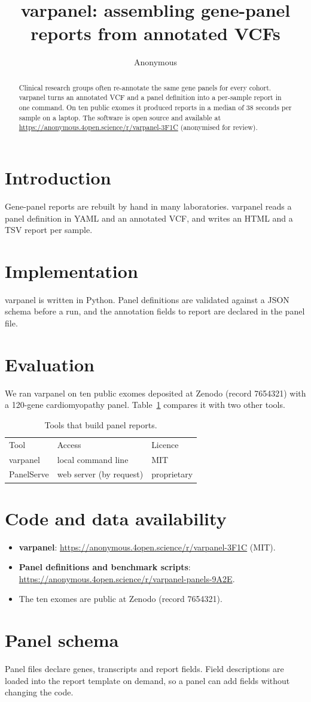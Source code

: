 \documentclass{article}
\title{varpanel: assembling gene-panel reports from annotated VCFs}
\author{Anonymous}
\begin{document}
\maketitle

\begin{abstract}
Clinical research groups often re-annotate the same gene panels for every cohort. varpanel turns an
annotated VCF and a panel definition into a per-sample report in one command. On ten public exomes it
produced reports in a median of 38 seconds per sample on a laptop. The software is open source and
available at \url{https://anonymous.4open.science/r/varpanel-3F1C} (anonymised for review).
\end{abstract}

\section{Introduction}
Gene-panel reports are rebuilt by hand in many laboratories. varpanel reads a panel definition in YAML
and an annotated VCF, and writes an HTML and a TSV report per sample.

\section{Implementation}
varpanel is written in Python. Panel definitions are validated against a JSON schema before a run, and
the annotation fields to report are declared in the panel file.

\section{Evaluation}
We ran varpanel on ten public exomes deposited at Zenodo (record 7654321) with a 120-gene cardiomyopathy
panel. Table~\ref{tab:tools} compares it with two other tools.

\begin{table}[h]
\caption{Tools that build panel reports.}
\label{tab:tools}
\begin{tabular}{lll}
Tool & Access & Licence \\
varpanel & local command line & MIT \\
PanelServe & web server (by request) & proprietary \\
\end{tabular}
\end{table}

\section{Code and data availability}
\begin{itemize}
    \item \textbf{varpanel}: \url{https://anonymous.4open.science/r/varpanel-3F1C} (MIT).
    \item \textbf{Panel definitions and benchmark scripts}:
    \url{https://anonymous.4open.science/r/varpanel-panels-9A2E}.
    \item The ten exomes are public at Zenodo (record 7654321).
\end{itemize}

\appendix
\section{Panel schema}
Panel files declare genes, transcripts and report fields. Field descriptions are loaded into the
report template on demand, so a panel can add fields without changing the code.
\end{document}
